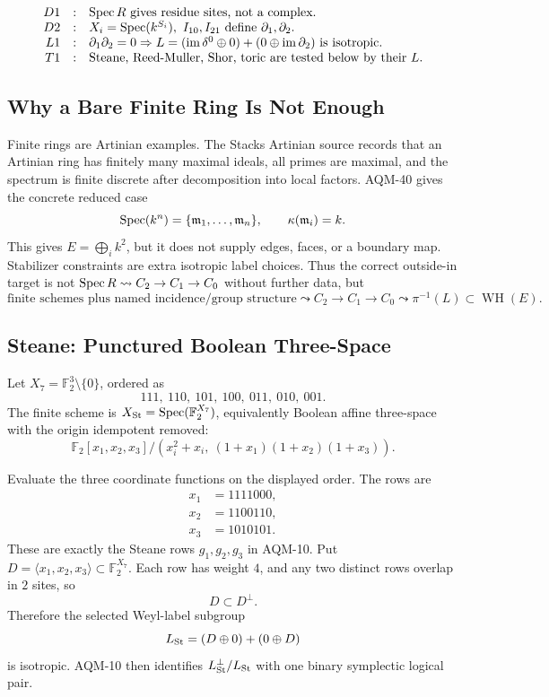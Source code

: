 \[
\begin{array}{rcl}
D1&:&\operatorname{Spec} R\text{ gives residue sites, not a complex.}\\
D2&:&X_i=\operatorname{Spec}(k^{S_i}),\ I_{10},I_{21}\text{ define }\partial_1,\partial_2.\\
L1&:&\partial_1\partial_2=0\Rightarrow
L=(\operatorname{im}\delta^0\oplus0)+(0\oplus\operatorname{im}\partial_2)
\text{ is isotropic.}\\
T1&:&\text{Steane, Reed-Muller, Shor, toric are tested below by their }L.
\end{array}
\]

\subsection{Why a Bare Finite Ring Is Not Enough}

Finite rings are Artinian examples.  The Stacks Artinian source records that
an Artinian ring has finitely many maximal ideals, all primes are maximal, and
the spectrum is finite discrete after decomposition into local factors.  AQM-40
gives the concrete reduced case
\[
  \operatorname{Spec}(k^n)=\{\mathfrak m_1,\ldots,\mathfrak m_n\},
  \qquad \kappa(\mathfrak m_i)=k.
\]
This gives \(E=\bigoplus_i k^2\), but it does not supply edges, faces, or a
boundary map.  Stabilizer constraints are extra isotropic label choices.  Thus
the correct outside-in target is not \(\operatorname{Spec} R\leadsto C_2\to C_1\to C_0\)
without further data, but
\[
  \text{finite schemes plus named incidence/group structure}
  \leadsto C_2\to C_1\to C_0
  \leadsto \pi^{-1}(L)\subset\operatorname{WH}(E).
\]

\subsection{Steane: Punctured Boolean Three-Space}

Let \(X_7=\mathbb F_2^3\setminus\{0\}\), ordered as
\[
  111,\ 110,\ 101,\ 100,\ 011,\ 010,\ 001 .
\]
The finite scheme is \(X_{\rm St}=\operatorname{Spec}(\mathbb F_2^{X_7})\), equivalently
Boolean affine three-space with the origin idempotent removed:
\[
  \mathbb F_2[x_1,x_2,x_3]/(x_i^2+x_i,\ (1+x_1)(1+x_2)(1+x_3)).
\]

Evaluate the three coordinate functions on the displayed order.  The rows are
\[
\begin{aligned}
  x_1&=1111000,\\
  x_2&=1100110,\\
  x_3&=1010101.
\end{aligned}
\]
These are exactly the Steane rows \(g_1,g_2,g_3\) in AQM-10.  Put
\(D=\langle x_1,x_2,x_3\rangle\subset\mathbb F_2^{X_7}\).  Each row has weight
\(4\), and any two distinct rows overlap in \(2\) sites, so
\[
  D\subset D^\perp .
\]
Therefore the selected Weyl-label subgroup
\[
  L_{\rm St}=(D\oplus0)+(0\oplus D)
\]
is isotropic.  AQM-10 then identifies \(L_{\rm St}^\perp/L_{\rm St}\) with one
binary symplectic logical pair.

